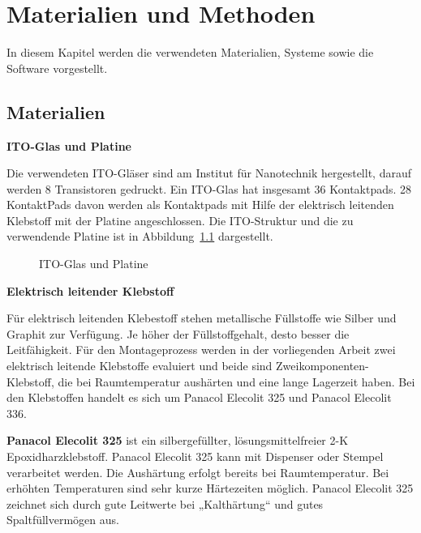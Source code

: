 \chapter{Materialien und Methoden}
\label{sec:Materialien}
In diesem Kapitel werden die verwendeten Materialien, Systeme sowie die Software vorgestellt.
\section{Materialien}
\large{\bf ITO-Glas und Platine}\normalsize

Die verwendeten ITO-Gläser sind am Institut für Nanotechnik hergestellt, darauf werden 8 Transistoren gedruckt. Ein ITO-Glas hat insgesamt 36 Kontaktpads. 28 KontaktPads davon werden als Kontaktpads mit Hilfe der elektrisch leitenden Klebstoff mit der Platine angeschlossen. Die ITO-Struktur und die zu verwendende Platine ist in Abbildung~\ref{fig:ITO-Glas und Platine}  dargestellt.
\begin{figure}[H]
\begin{center}
\caption{ITO-Glas und Platine}
\label{fig:ITO-Glas und Platine}
\end{center}
\end{figure}

\large{\bf Elektrisch leitender Klebstoff}\normalsize

Für elektrisch leitenden Klebestoff stehen metallische Füllstoffe wie Silber und Graphit zur Verfügung. Je höher der Füllstoffgehalt, desto besser die Leitfähigkeit. Für den Montageprozess werden in der vorliegenden Arbeit zwei elektrisch leitende Klebstoffe evaluiert und beide sind Zweikomponenten-Klebstoff, die bei Raumtemperatur aushärten und eine lange Lagerzeit haben. Bei den Klebstoffen handelt es sich um Panacol Elecolit 325 und Panacol Elecolit 336.

{\bf Panacol Elecolit 325} ist ein silbergefüllter, lösungsmittelfreier 2-K Epoxidharzklebstoff. Panacol Elecolit 325 kann mit Dispenser oder Stempel verarbeitet werden. Die Aushärtung erfolgt bereits bei Raumtemperatur. Bei erhöhten Temperaturen sind sehr kurze Härtezeiten möglich. Panacol Elecolit 325 zeichnet sich durch gute Leitwerte bei „Kalthärtung“ und gutes Spaltfüllvermögen aus. 

